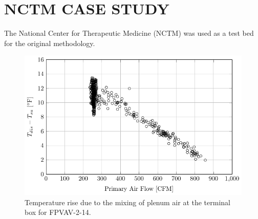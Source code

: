 \chapter{\uppercase{NCTM Case Study}}
The National Center for Therapeutic Medicine (NCTM) was used as a test bed for the original methodology. 


\begin{figure}
\includegraphics[]{Plots/TempRiseVsFlow-AHU-2-14.pdf}
\caption{Temperature rise due to the mixing of plenum air at the terminal box for FPVAV-2-14. }
\end{figure}